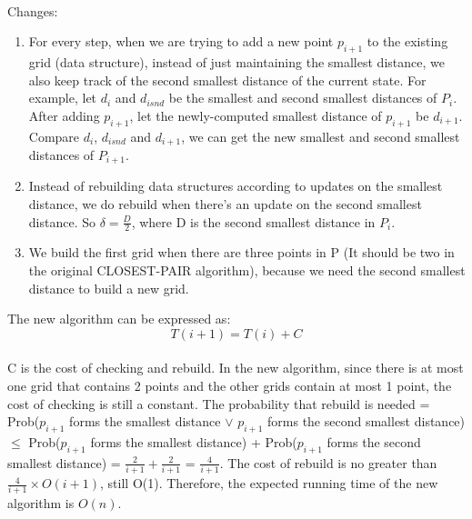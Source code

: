 \begin{problem}{5} ~\\
Changes:
\begin{enumerate}
\item For every step, when we are trying to add a new point $p_{i+1}$ to the existing grid (data structure), instead of just maintaining the smallest distance, we also keep track of the second smallest distance of the current state. For example, let $d_i$ and $d_{i snd}$ be the smallest and second smallest distances of $P_i$. After adding $p_{i+1}$, let the newly-computed smallest distance of $p_{i+1}$ be $d_{i+1}$. Compare $d_i$, $d_{i snd}$ and $d_{i+1}$, we can get the new smallest and second smallest distances of $P_{i+1}$.
\item Instead of rebuilding data structures according to updates on the smallest distance, we do rebuild when there's an update on the second smallest distance. So $\delta = \frac{D}{2}$, where D is the second smallest distance in $P_i$.
\item We build the first grid when there are three points in P (It should be two in the original CLOSEST-PAIR algorithm), because we need the second smallest distance to build a new grid.
\end{enumerate}
The new algorithm can be expressed as:
$$T(i+1) = T(i) + C$$\\
C is the cost of checking and rebuild. In the new algorithm, since there is at most one grid that contains 2 points and the other grids contain at most 1 point, the cost of checking is still a constant. The probability that rebuild is needed = Prob($p_{i+1}$ forms the smallest distance $\vee$ $p_{i+1}$ forms the second smallest distance) $\leq$ Prob($p_{i+1}$ forms the smallest distance) + Prob($p_{i+1}$ forms the second smallest distance) = $\frac{2}{i+1} + \frac{2}{i+1}$ = $\frac{4}{i+1}$. The cost of rebuild is no greater than $\frac{4}{i+1} \times O(i+1)$, still O(1). Therefore, the expected running time of the new algorithm is $O(n)$.
\end{problem}